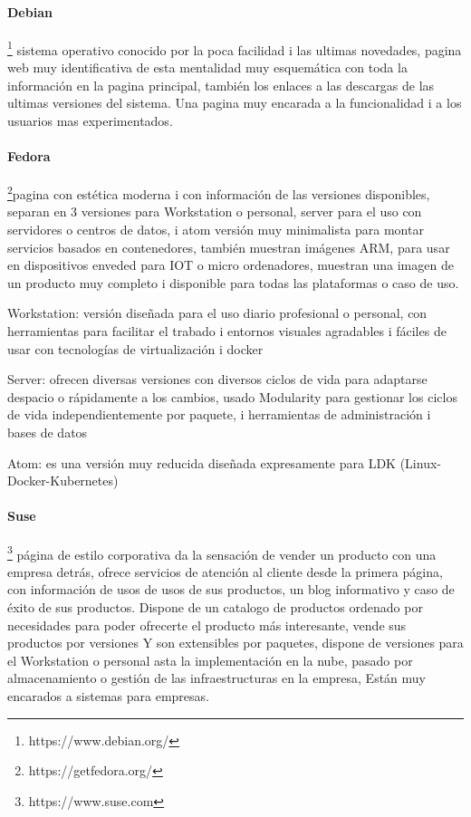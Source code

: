 \documentclass[preprint,11pt]{elsarticle}
\begin{document}
\paragraph{Debian}\footnote{https://www.debian.org/} sistema operativo conocido por la poca facilidad i las ultimas novedades,  pagina web muy identificativa de esta mentalidad muy esquemática con toda la información en la pagina principal, también los enlaces a las descargas de las ultimas versiones del sistema. Una pagina muy encarada a la funcionalidad i a los usuarios mas experimentados.

\paragraph{Fedora}\footnote{https://getfedora.org/}pagina con estética moderna i con información de las versiones disponibles, separan en 3 versiones para Workstation o personal, server para el uso con servidores o centros de datos, i atom versión muy minimalista para montar servicios basados en contenedores, también muestran imágenes ARM, para usar en dispositivos enveded para IOT o micro ordenadores, muestran una imagen de un producto muy completo i disponible para todas las plataformas o caso de uso.\bigskip

Workstation: versión diseñada para el uso diario profesional o personal, con herramientas para facilitar el trabado i entornos visuales agradables i fáciles de usar con tecnologías de virtualización i docker\bigskip

Server: ofrecen diversas versiones con diversos ciclos de vida para adaptarse despacio o rápidamente a los cambios, usado Modularity para gestionar los ciclos de vida independientemente por paquete, i herramientas de administración i bases de datos\bigskip

Atom: es una versión muy reducida diseñada expresamente para  LDK (Linux-Docker-Kubernetes)\bigskip

\paragraph{Suse}\footnote{https://www.suse.com} página de estilo corporativa da la sensación de vender un producto con una empresa detrás, ofrece servicios de atención al cliente desde la primera página, con información de usos de usos de sus productos, un blog informativo y caso de éxito de sus productos. Dispone de un catalogo de productos ordenado por necesidades para poder ofrecerte el producto más interesante, vende sus productos por versiones Y son extensibles por paquetes, dispone de versiones para el Workstation o personal asta la implementación en la nube, pasado por almacenamiento o gestión de las infraestructuras en la empresa, Están muy encarados a sistemas para empresas. \bigskip
\end{document}

